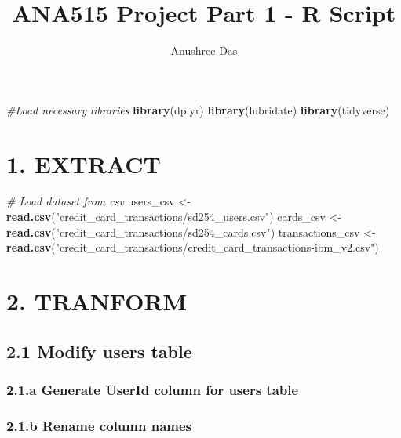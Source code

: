 \documentclass[
]{article}
\title{ANA515 Project Part 1 - R Script}
\author{Anushree Das}
\date{}
\newenvironment{Shaded}{\begin{snugshade}}{\end{snugshade}}
\newcommand{\CommentTok}[1]{\textcolor[rgb]{0.56,0.35,0.01}{\textit{#1}}}
\newcommand{\FunctionTok}[1]{\textcolor[rgb]{0.13,0.29,0.53}{\textbf{#1}}}
\newcommand{\NormalTok}[1]{#1}
\newcommand{\OtherTok}[1]{\textcolor[rgb]{0.56,0.35,0.01}{#1}}
\newcommand{\StringTok}[1]{\textcolor[rgb]{0.31,0.60,0.02}{#1}}
\begin{document}
\maketitle

\begin{Shaded}
\begin{Highlighting}[]
\CommentTok{\#Load necessary libraries}
\FunctionTok{library}\NormalTok{(dplyr)}
\FunctionTok{library}\NormalTok{(lubridate)}
\FunctionTok{library}\NormalTok{(tidyverse)}
\end{Highlighting}
\end{Shaded}

\section{1. EXTRACT}\label{extract}

\begin{Shaded}
\begin{Highlighting}[]
\CommentTok{\# Load dataset from csv}
\NormalTok{users\_csv  }\OtherTok{\textless{}{-}} \FunctionTok{read.csv}\NormalTok{(}\StringTok{"credit\_card\_transactions/sd254\_users.csv"}\NormalTok{)}
\NormalTok{cards\_csv }\OtherTok{\textless{}{-}} \FunctionTok{read.csv}\NormalTok{(}\StringTok{"credit\_card\_transactions/sd254\_cards.csv"}\NormalTok{)}
\NormalTok{transactions\_csv }\OtherTok{\textless{}{-}} \FunctionTok{read.csv}\NormalTok{(}\StringTok{"credit\_card\_transactions/credit\_card\_transactions{-}ibm\_v2.csv"}\NormalTok{)}
\end{Highlighting}
\end{Shaded}

\section{2. TRANFORM}\label{tranform}

\subsection{2.1 Modify users table}\label{modify-users-table}

\subsubsection{2.1.a Generate UserId column for users
table}\label{a-generate-userid-column-for-users-table}

\subsubsection{2.1.b Rename column names}\label{b-rename-column-names}
\end{document}

